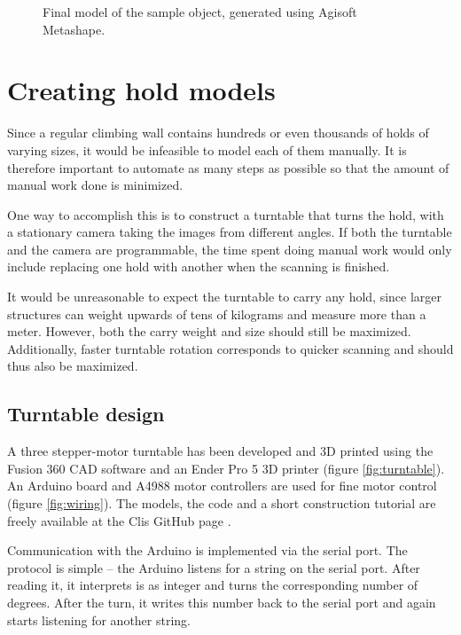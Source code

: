 \begin{figure}
	\centering
	\hfill
	\caption{Final model of the sample object, generated using Agisoft Metashape.}%
\end{figure}

\section{Creating hold models}
Since a regular climbing wall contains hundreds or even thousands of holds of varying sizes, it would be infeasible to model each of them manually.
It is therefore important to automate as many steps as possible so that the amount of manual work done is minimized.

One way to accomplish this is to construct a turntable that turns the hold, with a stationary camera taking the images from different angles.
If both the turntable and the camera are programmable, the time spent doing manual work would only include replacing one hold with another when the scanning is finished.

It would be unreasonable to expect the turntable to carry any hold, since larger structures can weight upwards of tens of kilograms and measure more than a meter.
However, both the carry weight and size should still be maximized.
Additionally, faster turntable rotation corresponds to quicker scanning and should thus also be maximized.

\subsection{Turntable design}
A three stepper-motor turntable has been developed and 3D printed using the Fusion 360 CAD software and an Ender Pro 5 3D printer (figure \ref{fig:turntable}).
An Arduino board and A4988 motor controllers are used for fine motor control (figure \ref{fig:wiring}).
The models, the code and a short construction tutorial are freely available at the Clis GitHub page \cite{clis}.

Communication with the Arduino is implemented via the serial port.
The protocol is simple -- the Arduino listens for a string on the serial port.
After reading it, it interprets is as integer and turns the corresponding number of degrees.
After the turn, it writes this number back to the serial port and again starts listening for another string.

